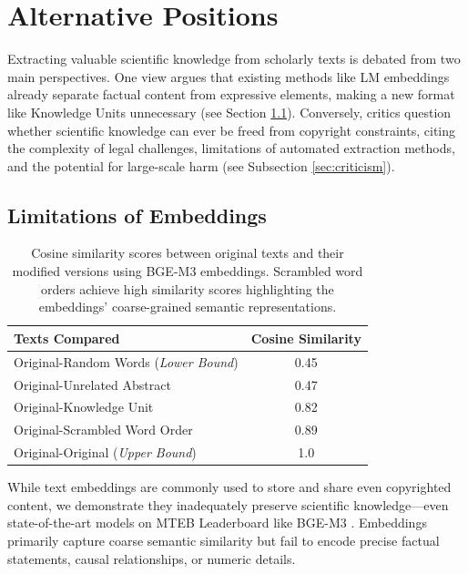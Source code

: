 \vspace{-0.2cm}
\section{Alternative Positions}
\vspace{-0.1cm}

Extracting valuable scientific knowledge from scholarly texts is debated from two main perspectives. One view argues that existing methods like LM embeddings already separate factual content from expressive elements, making a new format like Knowledge Units unnecessary (see Section \ref{sec:embed}). Conversely, critics question whether scientific knowledge can ever be freed from copyright constraints, citing the complexity of legal challenges, limitations of automated extraction methods, and the potential for large-scale harm (see Subsection \ref{sec:criticism}).

\vspace{-0.2cm}
\subsection{Limitations of Embeddings}
\label{sec:embed}

\begin{table}[t]
\centering
\small
\vspace{-0.25cm}
\setlength{\tabcolsep}{6pt} %
\caption{Cosine similarity scores between original texts and their modified versions using BGE-M3 embeddings. Scrambled word orders achieve high similarity scores highlighting the embeddings' coarse-grained semantic representations.}\vspace{0.1cm}\label{tab:cosine_similarity}
\begin{tabular}{lc}
\toprule
\textbf{Texts Compared} & \textbf{Cosine Similarity} \\ \midrule
Original-Random Words (\textit{Lower Bound}) & 0.45 \\
Original-Unrelated Abstract & 0.47 \\ 
Original-Knowledge Unit  & 0.82 \\ 
Original-Scrambled Word Order & 0.89 \\
Original-Original (\textit{Upper Bound}) & 1.0\\ \bottomrule
\end{tabular}
\vspace{-0.5cm}
\end{table}

While text embeddings are commonly used to store and share even copyrighted content, we demonstrate they inadequately preserve scientific knowledge—even state-of-the-art models on MTEB Leaderboard \cite{muennighoff2023mtebmassivetextembedding} like BGE-M3 \cite{chen2024bgem3embeddingmultilingualmultifunctionality}. Embeddings primarily capture coarse semantic similarity but fail to encode precise factual statements, causal relationships, or numeric details.

